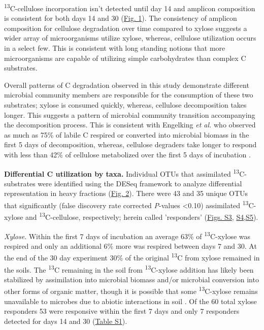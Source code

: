 \textsuperscript{13}C-cellulose incorporation isn't detected until day 14 and amplicon composition is consistent for both days 14 and 30 (\href{https://www.authorea.com/users/3537/articles/3612/master/file/figures/ordination_all1/ordination_all1.png}{Fig. 1}). The consistency of amplicon composition for cellulose degradation over time compared to xylose suggests a wider array of microorganisms utilize xylose, whereas, cellulose utilization occurs in a select few. This is consistent with long standing notions that more microorganisms are capable of utilizing simple carbohydrates than complex C substrates. 

Overall patterns of C degradation observed in this study demonstrate different microbial community members are responsible for the consumption of these two substrates; xylose is consumed quickly, whereas, cellulose decomposition takes longer. This suggests a pattern of microbial community transition accompanying the decomposition process. This is consistent with Engelking \textit{et al.}\cite{Engelking_2007} who observed as much as 75\% of labile C respired or converted into microbial biomass in the first 5 days of decomposition, whereas, cellulose degraders take longer to respond with less than 42\% of cellulose metabolized over the first 5 days of incubation \cite{Hu_1997}. 

\textbf{Differential C utilization by taxa.} Individual OTUs that assimilated \textsuperscript{13}C-substrates were identified using the DESeq framework \cite{Anders_Huber_2010} to analyze differential representation in heavy fractions (\href{https://www.authorea.com/users/3537/articles/3612/master/file/figures/l2fc_fig1/l2fc_fig.pdf}{Fig. 2}). There were 43 and 35 unique OTUs that significantly (false discovery rate corrected \textit{P}-values \textless 0.10) assimilated \textsuperscript{13}C-xylose and \textsuperscript{13}C-cellulose, respectively; herein called 'responders' (\href{https://www.authorea.com/users/3537/articles/8459/master/file/figures/OTU_screening_schematic/OTU_screening_schematic.pdf}{Figs. S3}, \href{https://www.authorea.com/users/3537/articles/8459/master/file/figures/l2fc_fig_pVal/l2fc_fig_pVal.png}{S4},\href{https://authorea.com/users/3537/articles/8459/master/file/figures/manhattan/manhattan.png}{S5}).

\textit{Xylose}. Within the first 7 days of incubation an average 63\% of \textsuperscript{13}C-xylose was respired and only an additional 6\% more was respired between days 7 and 30. At the end of the 30 day experiment 30\% of the original \textsuperscript{13}C from xylose remained in the soils. The \textsuperscript{13}C remaining in the soil from \textsuperscript{13}C-xylose addition has likely been stabilized by assimilation into microbial biomass and/or microbial conversion into other forms of organic matter, though it is possible that some \textsuperscript{13}C-xylose remains unavailable to microbes due to abiotic interactions in soil \cite{Kalbitz_2000}. Of the 60 total xylose responders 53 were responsive within the first 7 days and only 7 responders detected for days 14 and 30 (\href{https://authorea.com/users/3537/articles/8459/master/file/figures/resp_table/resp_table.png}{Table S1}). 

